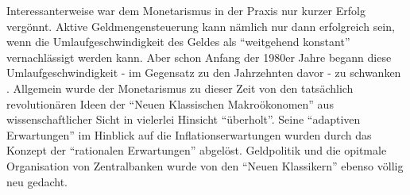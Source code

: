 Interessanterweise war dem Monetarismus in der Praxis nur kurzer Erfolg vergönnt. Aktive Geldmengensteuerung kann nämlich nur dann erfolgreich sein, wenn die Umlaufgeschwindigkeit des Geldes als "`weitgehend konstant"' vernachlässigt werden kann. Aber schon Anfang der 1980er Jahre begann diese Umlaufgeschwindigkeit - im Gegensatz zu den Jahrzehnten davor - zu schwanken \parencite[S. 703]{Samuelson1998}. Allgemein wurde der Monetarismus zu dieser Zeit von den tatsächlich revolutionären Ideen der "`Neuen Klassischen Makroökonomen"' aus wissenschaftlicher Sicht in vielerlei Hinsicht "`überholt"'. Seine "`adaptiven Erwartungen"' im Hinblick auf die Inflationserwartungen wurden durch das Konzept der "`rationalen Erwartungen"' abgelöst. Geldpolitik und die opitmale Organisation von Zentralbanken wurde von den "`Neuen Klassikern"' ebenso völlig neu gedacht. 


